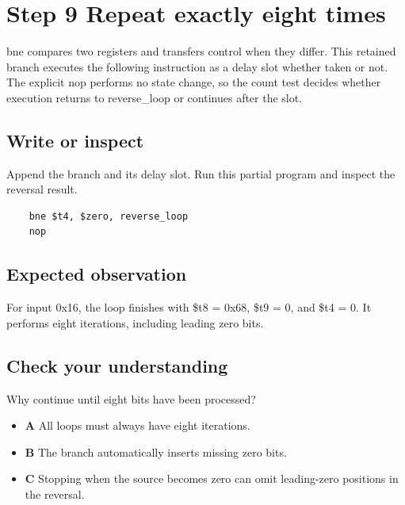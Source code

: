 \section{Step 9 Repeat exactly eight
  times}\label{003-eight-byte-sprite-s09-step-9-repeat-exactly-eight-times}

bne compares two registers and transfers control when they differ. This
retained branch executes the following instruction as a delay slot
whether taken or not. The explicit nop performs no state change, so the
count test decides whether execution returns to reverse\_loop or
continues after the slot.

\subsection{Write or
  inspect}\label{003-eight-byte-sprite-s09-write-or-inspect}

Append the branch and its delay slot. Run this partial program and
inspect the reversal result.

\begin{verbatim}
    bne $t4, $zero, reverse_loop
    nop
\end{verbatim}

\subsection{Expected
  observation}\label{003-eight-byte-sprite-s09-expected-observation}

For input 0x16, the loop finishes with \$t8 = 0x68, \$t9 = 0, and \$t4 =
0. It performs eight iterations, including leading zero bits.

\subsection{Check your
  understanding}\label{003-eight-byte-sprite-s09-check-your-understanding}

Why continue until eight bits have been processed?

\begin{itemize}
  \tightlist
  \item
        \textbf{A} All loops must always have eight iterations.
  \item
        \textbf{B} The branch automatically inserts missing zero bits.
  \item
        \textbf{C} Stopping when the source becomes zero can omit leading-zero
        positions in the reversal.
\end{itemize}
